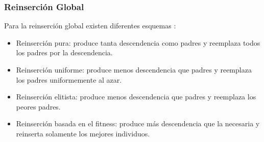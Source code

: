 \subsubsection{Reinserción Global}
Para la reinserción global existen diferentes esquemas \cite{geatbx}:

\begin{itemize}
    \item Reinserción pura: produce tanta descendencia como padres y reemplaza todos los padres por la descendencia.
    \item Reinserción uniforme: produce menos descendencia que padres y reemplaza los padres uniformemente al azar.
    \item Reinserción elitista: produce menos descendencia que padres y reemplaza los peores padres.
    \item Reinserción basada en el fitness: produce más descendencia que la necesaria y reinserta solamente los mejores individuos.
\end{itemize}


